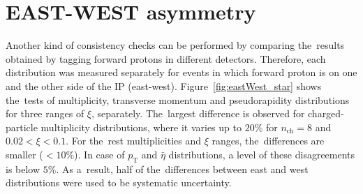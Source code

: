 \section{EAST-WEST asymmetry}\label{section:star_eastWest}
Another kind of consistency checks can be performed by comparing the~results obtained by tagging forward protons in different detectors.
Therefore, each distribution was measured separately for events in which forward proton
is on one and the other side of the IP (east-west). 
Figure~\ref{fig:eastWest_star} shows the~tests of multiplicity, transverse momentum and pseudorapidity distributions for three ranges of $\xi$, separately.
The~largest difference is observed for charged-particle multiplicity distributions, where it varies up to $20\%$ for $n_\textrm{ch}=8$ and $0.02 < \xi < 0.1$. 
For the~rest multiplicities and $\xi$ ranges, the~differences are smaller ($<10\%$). In case of $p_\textrm{T}$ and $\bar{\eta}$ distributions, a level of  these disagreements is  below $5\%$. As a~result,
half of the~differences between east and west distributions were used to be  systematic uncertainty.

